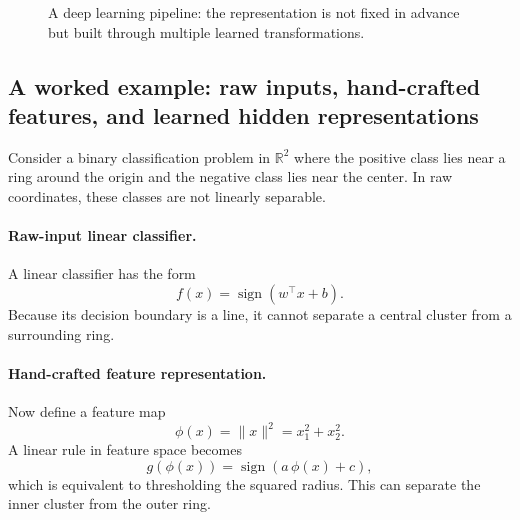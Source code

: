\begin{figure}[tbp]
\centering
{}
\caption{A deep learning pipeline: the representation is not fixed in advance but built through multiple learned transformations.}
\end{figure}

\subsection*{A worked example: raw inputs, hand-crafted features, and learned hidden representations}

Consider a binary classification problem in $\mathbb R^2$ where the positive class lies near a ring around the origin and the negative class lies near the center. In raw coordinates, these classes are not linearly separable.

\paragraph{Raw-input linear classifier.}
A linear classifier has the form
\[
f(x)=\operatorname{sign}(w^\top x+b).
\]
Because its decision boundary is a line, it cannot separate a central cluster from a surrounding ring.

\paragraph{Hand-crafted feature representation.}
Now define a feature map
\[
\phi(x)=\|x\|^2=x_1^2+x_2^2.
\]
A linear rule in feature space becomes
\[
g(\phi(x))=\operatorname{sign}(a\,\phi(x)+c),
\]
which is equivalent to thresholding the squared radius. This can separate the inner cluster from the outer ring.

